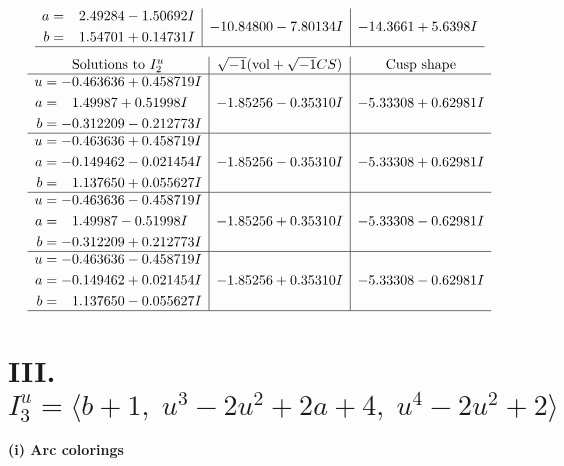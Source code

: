 \documentclass[1p]{elsarticle_modified}
\theoremstyle{definition}
\newcommand{\I}{\sqrt{-1}}
\begin{document}
$$\begin{array}{c|c|c}
\begin{aligned}
a &= \phantom{-}2.49284 - 1.50692 I \\
b &= \phantom{-}1.54701 + 0.14731 I\end{aligned}
 & -10.84800 - 7.80134 I & -14.3661 + 5.6398 I\\
 \hline 
 \end{array}$$\newpage$$\begin{array}{c|c|c}  
\text{Solutions to }I^u_{2}& \I (\text{vol} + \sqrt{-1}CS) & \text{Cusp shape}\\
 \hline 
\begin{aligned}
u &= -0.463636 + 0.458719 I \\
a &= \phantom{-}1.49987 + 0.51998 I \\
b &= -0.312209 - 0.212773 I\end{aligned}
 & -1.85256 - 0.35310 I & -5.33308 + 0.62981 I \\ \hline\begin{aligned}
u &= -0.463636 + 0.458719 I \\
a &= -0.149462 - 0.021454 I \\
b &= \phantom{-}1.137650 + 0.055627 I\end{aligned}
 & -1.85256 - 0.35310 I & -5.33308 + 0.62981 I \\ \hline\begin{aligned}
u &= -0.463636 - 0.458719 I \\
a &= \phantom{-}1.49987 - 0.51998 I \\
b &= -0.312209 + 0.212773 I\end{aligned}
 & -1.85256 + 0.35310 I & -5.33308 - 0.62981 I \\ \hline\begin{aligned}
u &= -0.463636 - 0.458719 I \\
a &= -0.149462 + 0.021454 I \\
b &= \phantom{-}1.137650 - 0.055627 I\end{aligned}
 & -1.85256 + 0.35310 I & -5.33308 - 0.62981 I\\
 \hline 
 \end{array}$$\newpage\newpage\renewcommand{\arraystretch}{1}
\centering \section*{III. $I^u_{3}= \langle b+1,\;u^3-2 u^2+2 a+4,\;u^4-2 u^2+2 \rangle$}
\flushleft \textbf{(i) Arc colorings}\\
\end{document}
